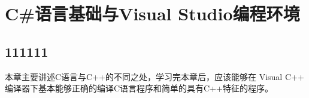 ﻿%

\chapter{C\#语言基础与Visual Studio编程环境}
\section{111111}
本章主要讲述C语言与C++的不同之处，学习完本章后，应该能够在 Visual C++
编译器下基本能够正确的编译C语言程序和简单的具有C++特征的程序。

 
